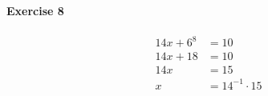 \documentclass{article}
\begin{document}
\pagebreak
\paragraph{Exercise 8}

\begin{align*}
    14x + 6^8 &= 10 \\
    14x + 18 &= 10 \\
    14x &= 15 \\
    x &= 14^{-1} \cdot 15 \\
\end{align*}
\end{document}
